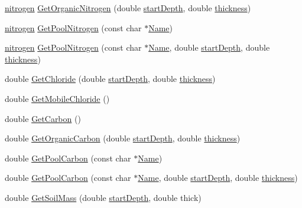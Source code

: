 \begin{DoxyCompactItemize}
\item 
\hyperlink{classnitrogen}{nitrogen} \hyperlink{classsoil_layer_a0ced82f9d04aa117b289acd4daa61659}{GetOrganicNitrogen} (double \hyperlink{classsoil_layer_acbee67e83ac96f6906c03498366616b6}{startDepth}, double \hyperlink{classsoil_layer_adaeedd67db3ed2312056db1469945ffa}{thickness})
\item 
\hyperlink{classnitrogen}{nitrogen} \hyperlink{classsoil_layer_ae96a8b15fed4200fee1a8001599e3c8d}{GetPoolNitrogen} (const char $\ast$\hyperlink{classbase_abd8f99d007cb1914c0837488829974ec}{Name})
\item 
\hyperlink{classnitrogen}{nitrogen} \hyperlink{classsoil_layer_aa3f614a875b5dbc8b8002f56595abb37}{GetPoolNitrogen} (const char $\ast$\hyperlink{classbase_abd8f99d007cb1914c0837488829974ec}{Name}, double \hyperlink{classsoil_layer_acbee67e83ac96f6906c03498366616b6}{startDepth}, double \hyperlink{classsoil_layer_adaeedd67db3ed2312056db1469945ffa}{thickness})
\item 
double \hyperlink{classsoil_layer_ad3683d88ec613da7fd985169287c1553}{GetChloride} (double \hyperlink{classsoil_layer_acbee67e83ac96f6906c03498366616b6}{startDepth}, double \hyperlink{classsoil_layer_adaeedd67db3ed2312056db1469945ffa}{thickness})
\item 
double \hyperlink{classsoil_layer_a5fbc355a58ae5a65cacdc2646c3539ff}{GetMobileChloride} ()
\item 
double \hyperlink{classsoil_layer_a6fe7e84c83e345c297bc55cae7f36acc}{GetCarbon} ()
\item 
double \hyperlink{classsoil_layer_a5ee886837c6c59aa88ff44633bbd5c4b}{GetOrganicCarbon} (double \hyperlink{classsoil_layer_acbee67e83ac96f6906c03498366616b6}{startDepth}, double \hyperlink{classsoil_layer_adaeedd67db3ed2312056db1469945ffa}{thickness})
\item 
double \hyperlink{classsoil_layer_ad7a5ec5dc0f1ae8ffa47cfa94d55d552}{GetPoolCarbon} (const char $\ast$\hyperlink{classbase_abd8f99d007cb1914c0837488829974ec}{Name})
\item 
double \hyperlink{classsoil_layer_a80dfe52e3c2b3a2698f65658d9dd6c5e}{GetPoolCarbon} (const char $\ast$\hyperlink{classbase_abd8f99d007cb1914c0837488829974ec}{Name}, double \hyperlink{classsoil_layer_acbee67e83ac96f6906c03498366616b6}{startDepth}, double \hyperlink{classsoil_layer_adaeedd67db3ed2312056db1469945ffa}{thickness})
\item 
double \hyperlink{classsoil_layer_a4b942365583f2cb8356cdef3cebe8dde}{GetSoilMass} (double \hyperlink{classsoil_layer_acbee67e83ac96f6906c03498366616b6}{startDepth}, double thick)

\end{DoxyCompactItemize}
